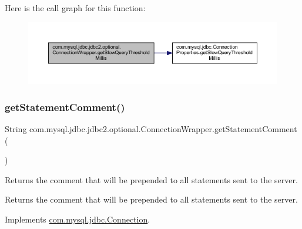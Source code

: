 Here is the call graph for this function\+:
\nopagebreak
\begin{figure}[H]
\begin{center}
\leavevmode
\includegraphics[width=350pt]{classcom_1_1mysql_1_1jdbc_1_1jdbc2_1_1optional_1_1_connection_wrapper_ae9a4a918bb9abd4ff539363763f49b25_cgraph}
\end{center}
\end{figure}
\mbox{\label{classcom_1_1mysql_1_1jdbc_1_1jdbc2_1_1optional_1_1_connection_wrapper_a14a98d8f5aed8168fbb25a76210e9878}} 
\subsubsection{\texorpdfstring{get\+Statement\+Comment()}{getStatementComment()}}
{\footnotesize\ttfamily String com.\+mysql.\+jdbc.\+jdbc2.\+optional.\+Connection\+Wrapper.\+get\+Statement\+Comment (\begin{DoxyParamCaption}{ }\end{DoxyParamCaption})}

Returns the comment that will be prepended to all statements sent to the server.

\begin{DoxyReturn}{Returns}
the comment that will be prepended to all statements sent to the server. 
\end{DoxyReturn}


Implements \mbox{\hyperlink{interfacecom_1_1mysql_1_1jdbc_1_1_connection_a9db688dc671cce2bd98b3f34128981f8}{com.\+mysql.\+jdbc.\+Connection}}.

